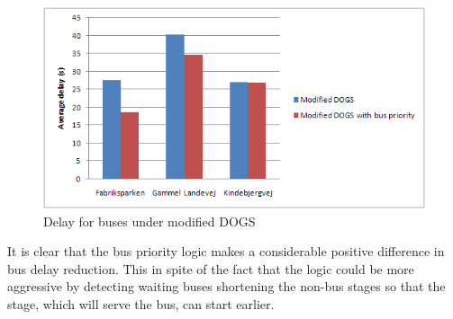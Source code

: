 \begin{figure}[ht]
\centering
\includegraphics[scale=0.30]{delay_bus_modified-dogs.png}
\caption{Delay for buses under modified DOGS}
\label{fig:delay_bus_modified_dogs}
\end{figure}

It is clear that the bus priority logic makes a considerable positive difference in bus delay reduction. This in spite of the fact that the logic could be more aggressive by detecting waiting buses shortening the non-bus stages so that the stage, which will serve the bus, can start earlier.
